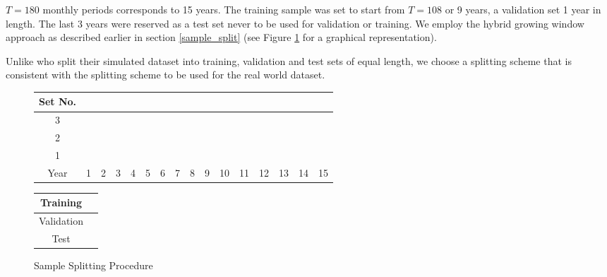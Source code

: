 \documentclass[a4paper, table]{article}
\begin{document}
$T = 180$ monthly periods corresponds to 15 years. The training sample was set to start from $T = 108$ or 9 years, a validation set 1 year in length. The last 3 years were reserved as a test set never to be used for validation or training. We employ the hybrid growing window approach as described earlier in section \ref{sample_split} (see Figure \ref{sample_split_diag} for a graphical representation).

Unlike \cite{gu_empirical_2018} who split their simulated dataset into training, validation and test sets of equal length, we choose a splitting scheme that is consistent with the splitting scheme to be used for the real world dataset.

\begin{figure}
	\begin{center}
		\begin{tabular}{|c|p{0.25cm}p{0.25cm}p{0.25cm}p{0.25cm}p{0.25cm}p{0.25cm}p{0.25cm}p{0.25cm}p{0.25cm}p{0.25cm}p{0.25cm}p{0.25cm}|p{0.25cm}p{0.25cm}p{0.25cm}|}
			\hline
			Set No. &&&&&&&&&&&&&&& \\
			\hline
			3 & \cellcolor{cyan} & \cellcolor{cyan} & \cellcolor{cyan} & \cellcolor{cyan} & \cellcolor{cyan} & \cellcolor{cyan} & \cellcolor{cyan} & \cellcolor{cyan} & \cellcolor{cyan} & \cellcolor{cyan} & \cellcolor{cyan} &
			\cellcolor{pink} & 
			\cellcolor{olive} & \cellcolor{olive} &	\cellcolor{olive} \\
			2 & \cellcolor{cyan} & \cellcolor{cyan} & \cellcolor{cyan} & \cellcolor{cyan} & \cellcolor{cyan} & \cellcolor{cyan} & \cellcolor{cyan} & \cellcolor{cyan} & \cellcolor{cyan} & \cellcolor{cyan} &
			\cellcolor{pink} & 
			\cellcolor{olive} & \cellcolor{olive} &	\cellcolor{olive} & \cellcolor{olive} \\
			1 & \cellcolor{cyan} & \cellcolor{cyan} & \cellcolor{cyan} & \cellcolor{cyan} & \cellcolor{cyan} & \cellcolor{cyan} & \cellcolor{cyan} & \cellcolor{cyan} & \cellcolor{cyan} &
			\cellcolor{pink} & 
			\cellcolor{olive} & \cellcolor{olive} &	\cellcolor{olive} & \cellcolor{olive} & \cellcolor{olive} \\
			\hline
			Year & 1 & 2 & 3 & 4 & 5 & 6 & 7 & 8 & 9 & 10 & 11 & 12 & 13 & 14 & 15\\
			\hline
		\end{tabular}
		\medskip
		\begin{tabular}{|c|p{0.25cm}|}
			\hline
			Training & \cellcolor{cyan} \\
			\hline
			Validation & \cellcolor{pink} \\
			\hline
			Test & \cellcolor{olive} \\
			\hline
		\end{tabular}
	\end{center}
	\caption{Sample Splitting Procedure}
	\label{sample_split_diag}
\end{figure}
\end{document}
